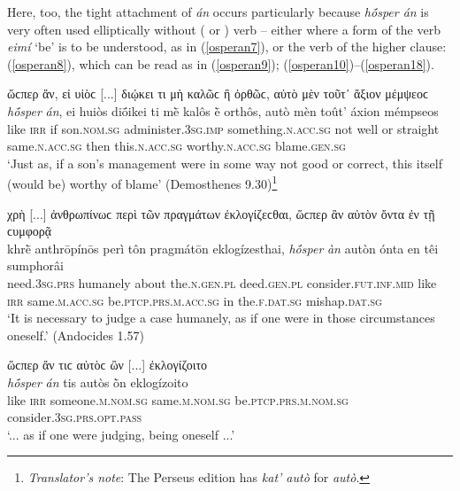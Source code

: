 Here, too, the tight attachment of \emph{án} occurs particularly because \emph{hṓsper án} is very often used elliptically without ( or ) verb -- either where a form of the verb \emph{eimí} `be' is to be understood, as in (\ref{osperan7}), or the verb of the higher clause: (\ref{osperan8}), which can be read as in (\ref{osperan9}); (\ref{osperan10})--(\ref{osperan18}).

\begin{exe}
\ex ὥϲπερ ἄν, εἰ υἱὸϲ {[}...{]} διῴκει τι μὴ καλῶϲ ἢ ὀρθῶϲ, αὐτὸ μὲν τοῦτ᾽ ἄξιον μέμψεοϲ\\
\gll \emph{hṓsper} \emph{án}, ei huiòs diṓikei ti mḕ kalôs ḕ orthôs, autò mèn toût' áxion mémpseos\\
like \textsc{irr} if son.\textsc{nom.sg} administer.\textsc{3sg.imp}
something.\textsc{n.acc.sg} not well or straight same.\textsc{n.acc.sg} then this.\textsc{n.acc.sg} worthy.\textsc{n.acc.sg} blame.\textsc{gen.sg}\\
\trans `Just as, if a son's management were in some way not good or correct, this itself (would be) worthy of blame' (Demosthenes 9.30)\footnote{\emph{Translator's note}: The Perseus edition has \textit{kat' autò} for \textit{autò}.}
\label{osperan7}
\end{exe}

\begin{exe}
\ex χρὴ {[}...{]} ἀνθρωπίνωϲ περὶ τῶν πραγμάτων ἐκλογίζεϲθαι, ὥϲπερ ἂν αὐτὸν ὄντα ἐν τῇ ϲυμφορᾷ\\
\gll khrḕ anthrōpínōs perì tôn pragmátōn eklogízesthai, \emph{hṓsper} \emph{àn} autòn ónta en têi sumphorâi\\
need.\textsc{3sg.prs} humanely about the.\textsc{n.gen.pl} deed.\textsc{gen.pl} consider.\textsc{fut.inf.mid} like \textsc{irr} same.\textsc{m.acc.sg} be.\textsc{ptcp.prs.m.acc.sg} in the.\textsc{f.dat.sg} mishap.\textsc{dat.sg}\\
\trans `It is necessary to judge a case humanely, as if one were in those circumstances oneself.' (Andocides 1.57)
\label{osperan8}
\end{exe}

\begin{exe}
\ex ὥϲπερ ἄν τιϲ αὐτὸϲ ὢν {[}...{]} ἐκλογίζοιτο\\
\gll \emph{hṓsper} \emph{án} tis autòs ṑn eklogízoito\\
like \textsc{irr} someone.\textsc{m.nom.sg} same.\textsc{m.nom.sg}
be.\textsc{ptcp.prs.m.nom.sg} consider.\textsc{3sg.prs.opt.pass}\\
\trans `... as if one were judging, being oneself ...'
\label{osperan9}
\end{exe}

